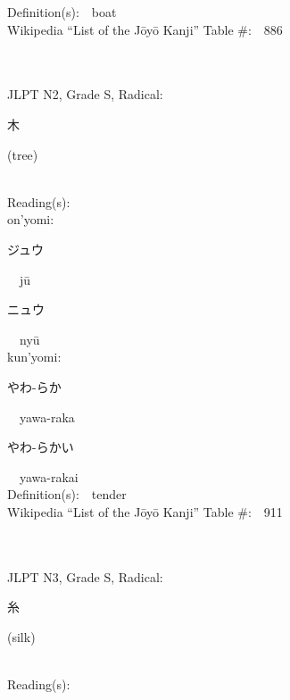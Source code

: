 \begin{multicols}{2}
Definition(s):\ \ boat \\
Wikipedia ``List of the J\=oy\=o Kanji'' Table \#:\ \ 886 \\
\ \ \\
{\fontsize{34pt}{40pt}  }\ \ \\  %
{JLPT N2, Grade S, Radical:\ \ {\begin{CJK}{UTF8}{min} 木 \end{CJK}} (tree) } \\
Reading(s):\ \ \\
{\hspace*{1em}}on'yomi:\ \ \\
{\hspace*{2em}}{\begin{CJK}{UTF8}{min} ジュウ \end{CJK}}\ \ j\=u\ \ \\
{\hspace*{2em}}{\begin{CJK}{UTF8}{min} ニュウ \end{CJK}}\ \ ny\=u\ \ \\
{\hspace*{1em}}kun'yomi:\ \ \\
{\hspace*{2em}}{\begin{CJK}{UTF8}{min} やわ-らか \end{CJK}}\ \ yawa-raka\ \ \\
{\hspace*{2em}}{\begin{CJK}{UTF8}{min} やわ-らかい \end{CJK}}\ \ yawa-rakai\ \ \\
Definition(s):\ \ tender \\
Wikipedia ``List of the J\=oy\=o Kanji'' Table \#:\ \ 911 \\
\ \ \\
{\fontsize{34pt}{40pt}  }\ \ \\  %
{JLPT N3, Grade S, Radical:\ \ {\begin{CJK}{UTF8}{min} 糸 \end{CJK}} (silk) } \\
Reading(s):\ \ \\

\end{multicols}
